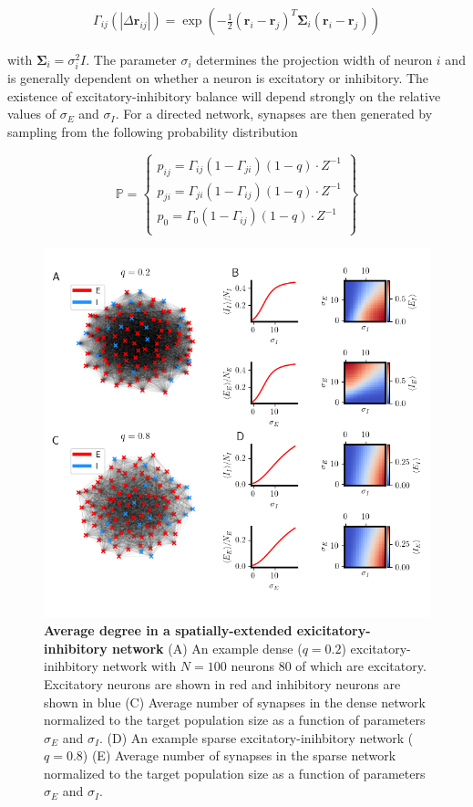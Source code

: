 \documentclass{ucetd}
\begin{document}
\begin{align}
\Gamma_{ij}(|\Delta\mathbf{r}_{ij}|) = \exp\left(-\frac{1}{2}(\mathbf{r}_{i}-\mathbf{r}_{j})^{T}\mathbf{\Sigma}_{i}(\mathbf{r}_{i}-\mathbf{r}_{j})\right)
\end{align}

with $\mathbf{\Sigma}_{i} = \sigma_{i}^{2}I$. The parameter $\sigma_{i}$ determines the projection width of neuron $i$ and is generally dependent on whether a neuron is excitatory or inhibitory. The existence of excitatory-inhibitory balance will depend strongly on the relative values of $\sigma_{E}$ and $\sigma_{I}$. For a directed network, synapses are then generated by sampling from the following probability distribution 

\begin{equation}
    \mathbb{P} = \left\{\begin{array}{lr}
        p_{ij} = \Gamma_{ij}(1-\Gamma_{ji})(1-q)\cdot Z^{-1}\\
        p_{ji} = \Gamma_{ji}(1-\Gamma_{ij})(1-q)\cdot Z^{-1}\\
        p_{0} = \Gamma_{0}(1-\Gamma_{ij})(1-q)\cdot Z^{-1}\\
        \end{array}\right\}
\end{equation}

\begin{figure}[t!]
\centering
\includegraphics[width=165mm]{figure-9}
\caption{\textbf{Average degree in a spatially-extended exicitatory-inhibitory network} (A) An example dense ($q=0.2$) excitatory-inihbitory network with $N=100$ neurons 80 of which are excitatory. Excitatory neurons are shown in red and inhibitory neurons are shown in blue (C) Average number of synapses in the dense network normalized to the target population size as a function of parameters $\sigma_{E}$ and $\sigma_{I}$. (D) An example sparse excitatory-inihbitory network ($q=0.8$) (E) Average number of synapses in the sparse network normalized to the target population size as a function of parameters $\sigma_{E}$ and $\sigma_{I}$.}
\end{figure}
\end{document}
